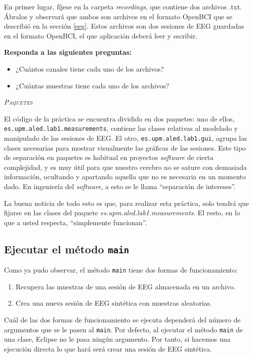 \documentclass[10pt,a4paper,spanish]{article}
\newcommand{\sombreado}[2]{
  \begin{shaded}
    \begin{center} \emph{\textsc{#1}} \end{center}
    \noindent #2\\
  \end{shaded}
}
\newcommand{\code}[1]{\texttt{#1}}
\begin{document}
En primer lugar, fíjese en la carpeta \textit{recordings}, que contiene dos archivos .txt. Ábralos y observará que ambos son archivos en el formato OpenBCI que se describió en la sección \ref{eeg}. Estos archivos son dos sesiones de EEG guardadas en el formato OpenBCI, el que aplicación deberá leer y escribir.

\textbf{Responda a las siguientes preguntas:}

\begin{itemize}
    \item ¿Cuántos canales tiene cada uno de los archivos?
    \item ¿Cuántas muestras tiene cada uno de los archivos?
\end{itemize}

\sombreado{Paquetes}{El código de la práctica se encuentra dividido en dos paquetes: uno de ellos, \code{es.upm.aled.lab1.measurements}, contiene las clases relativas al modelado y manipulado de las sesiones de EEG. El otro, \code{es.upm.aled.lab1.gui}, agrupa las clases necesarias para mostrar visualmente las gráficas de las sesiones. Este tipo de separación en paquetes es habitual en proyectos \textit{software} de cierta complejidad, y es muy útil para que nuestro cerebro no se sature con demasiada información, ocultando y apartando aquella que no es necesaria en un momento dado. En ingeniería del \textit{software}, a esto se le llama ``separación de intereses''.

La buena noticia de todo esto es que, para realizar esta práctica, solo tendrá que fijarse en las clases del paquete \textit{es.upm.aled.lab1.measurements}. El resto, en lo que a usted respecta, ``simplemente funcionan''.}

\subsection{Ejecutar el método \code{main}}

Como ya pudo observar, el método \code{main} tiene dos formas de funcionamiento:

\begin{enumerate}
    \item Recupera las muestras de una sesión de EEG almacenada en un archivo.
    \item Crea una nueva sesión de EEG sintética con muestras aleatorias.
\end{enumerate}

Cuál de las dos formas de funcionamiento se ejecuta dependerá del número de argumentos que se le pasen al \code{main}. Por defecto, al ejecutar el método \code{main} de una clase, Eclipse no le pasa ningún argumento. Por tanto, si hacemos una ejecución directa lo que hará será crear una sesión de EEG sintética.
\end{document}
